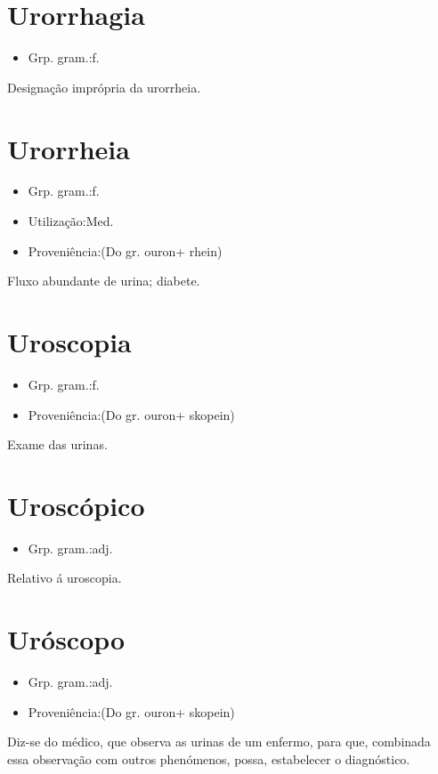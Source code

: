 \documentclass{article}
\begin{document}
\section{Urorrhagia}
\begin{itemize}
\item {Grp. gram.:f.}
\end{itemize}
Designação imprópria da urorrheia.
\section{Urorrheia}
\begin{itemize}
\item {Grp. gram.:f.}
\end{itemize}
\begin{itemize}
\item {Utilização:Med.}
\end{itemize}
\begin{itemize}
\item {Proveniência:(Do gr. \textunderscore ouron\textunderscore  + \textunderscore rhein\textunderscore )}
\end{itemize}
Fluxo abundante de urina; diabete.
\section{Uroscopia}
\begin{itemize}
\item {Grp. gram.:f.}
\end{itemize}
\begin{itemize}
\item {Proveniência:(Do gr. \textunderscore ouron\textunderscore  + \textunderscore skopein\textunderscore )}
\end{itemize}
Exame das urinas.
\section{Uroscópico}
\begin{itemize}
\item {Grp. gram.:adj.}
\end{itemize}
Relativo á uroscopia.
\section{Uróscopo}
\begin{itemize}
\item {Grp. gram.:adj.}
\end{itemize}
\begin{itemize}
\item {Proveniência:(Do gr. \textunderscore ouron\textunderscore  + \textunderscore skopein\textunderscore )}
\end{itemize}
Diz-se do médico, que observa as urinas de um enfermo, para que, combinada essa observação com outros phenómenos, possa, estabelecer o diagnóstico.
\end{document}
